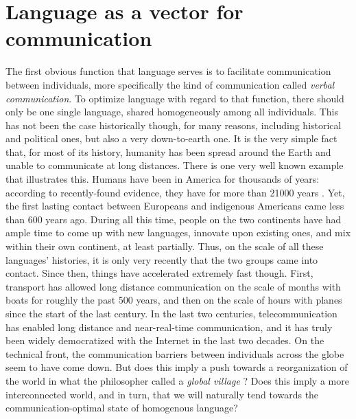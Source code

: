 \documentclass[../thesis.tex]{subfiles}
\begin{document}

\section{Language as a vector for communication}
The first obvious function that language serves is to facilitate communication between
individuals, more specifically the kind of communication called \emph{verbal
communication}. To optimize language with regard to that function, there should only be
one single language, shared homogeneously among all individuals. This has not been the
case historically though, for many reasons, including historical and political ones, but
also a very down-to-earth one. It is the very simple fact that, for most of its history,
humanity has been spread around the Earth and unable to communicate at long distances.
There is one very well known example that illustrates this. Humans have been in America
for thousands of years: according to recently-found evidence, they have for more than
\SI{21000}{} years \cite{BennettEvidenceHumans2021}. Yet, the first lasting contact
between Europeans and indigenous Americans came less than 600 years ago. During all this
time, people on the two continents have had ample time to come up with new languages,
innovate upon existing ones, and mix within their own continent, at least partially.
Thus, on the scale of all these languages' histories, it is only very recently that the
two groups came into contact. Since then, things have accelerated extremely fast though.
First, transport has allowed long distance communication on the scale of months with
boats for roughly the past 500 years, and then on the scale of hours with planes since
the start of the last century. In the last two centuries, telecommunication has enabled
long distance and near-real-time communication, and it has truly been widely
democratized with the Internet in the last two decades. On the technical front, the
communication barriers between individuals across the globe seem to have come down. But
does this imply a push towards a reorganization of the world in what the philosopher
 called a \emph{global village}
\cite{McLuhanGutenbergGalaxy2008}? Does this imply a more interconnected world, and in
turn, that we will naturally tend towards the communication-optimal state of homogenous
language?
\end{document}
